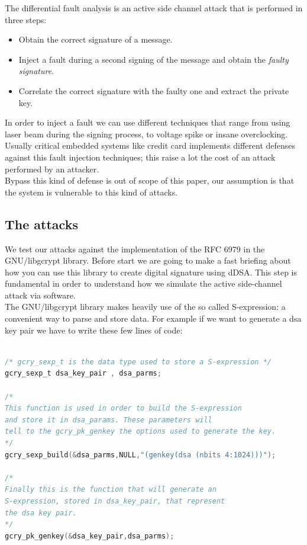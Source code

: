 \documentclass[11pt,english]{article}
\begin{document}
The differential fault analysis is an active side channel attack that is performed in three steps:
\begin{itemize}
\item Obtain the correct signature of a message.
\item Inject a fault during a second signing of the message and obtain the \textit{faulty signature}.
\item Correlate the correct signature with the faulty one and extract the private key.
\end{itemize}

In order to inject a fault we can use different techniques that range from using laser beam during the signing process, to voltage spike or insane overclocking.
\\Usually critical embedded systems like credit card implements different defenses against this fault injection techniques; this raise a lot the cost of an attack performed by an attacker. \\Bypass this kind of defense is out of scope of this paper, our assumption is that the system is vulnerable to this kind of attacks.

\subsection{The attacks}

We test our attacks against the implementation of the RFC 6979\cite{rfc} in the GNU/libgcrypt library\cite{lib}. 
Before start we are going to make a fast briefing about how you can use this library to create digital signature using dDSA. This step is fundamental in order to understand how we simulate the active side-channel attack via software.\\
The GNU/libgcrypt library\cite{lib} makes heavily use of the so called S-expression\cite{sexp}: a convenient way to parse and store data. For example if we want to generate a dsa key pair we have to write these few lines of code:

\begin{lstlisting}[language=c]

/* gcry_sexp_t is the data type used to store a S-expression */
gcry_sexp_t dsa_key_pair , dsa_parms;

/* 
This function is used in order to build the S-expression 
and store it in dsa_params. These parameters will
tell to the gcry_pk_genkey the options used to generate the key.
*/
gcry_sexp_build(&dsa_parms,NULL,"(genkey(dsa (nbits 4:1024)))");

/*
Finally this is the function that will generate an 
S-expression, stored in dsa_key_pair, that represent 
the dsa key pair.
*/
gcry_pk_genkey(&dsa_key_pair,dsa_parms);
  
\end{lstlisting}
\end{document}
